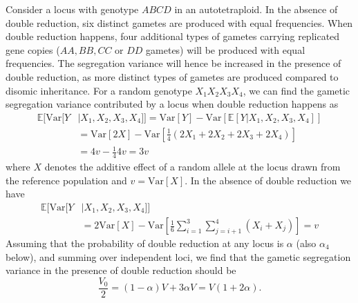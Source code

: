 \documentclass[unnumsec,webpdf,modern,large]{_oup-authoring-template}
\theoremstyle{thmstyleone}%
\theoremstyle{thmstyletwo}%
\theoremstyle{thmstylethree}%
\newcommand{\Ex}{\mathbb{E}}
\newcommand{\Var}{\mathrm{Var}}
\newcommand{\var}{\mathrm{Var}}
\begin{document}
Consider a locus with genotype $ABCD$ in an autotetraploid.
In the absence of double reduction, six distinct gametes are produced with
equal frequencies.
When double reduction happens, four additional types of gametes carrying
replicated gene copies ($AA, BB, CC$ or $DD$ gametes) will be produced with
equal frequencies.
The segregation variance will hence be increased in the presence of double
reduction, as more distinct types of gametes are produced compared to disomic
inheritance.
For a random genotype \(X_1X_2X_3X_4\), we can find the gametic segregation
variance contributed by a locus when double reduction happens as
\begin{align*}
    \Ex[\var[Y&|X_1,X_2,X_3,X_4]] = \var[Y] - \Var[\Ex[Y|X_1,X_2,X_3,X_4]] \\
        &= \var[2X] - \var\left[\frac1 4 (2X_1 + 2X_2 + 2X_3 + 2X_4)\right] \\
        &= 4v - \frac{1}{4}4v
        = 3v
\end{align*} where \(X\) denotes the additive effect of a random allele
at the locus drawn from the reference population and \(v = \Var[X]\).
In the absence of double reduction we have
\begin{align*}
    \Ex[\var[Y&|X_1,X_2,X_3,X_4]] \\
        &= 2\Var[X] - \var\left[\frac1 6 \sum_{i=1}^3 \sum_{j=i+1}^4(X_i+X_j)\right]
        = v
\end{align*}
Assuming that the probability of double reduction at any locus is \(\alpha\)
(also \(\alpha_4\) below), and summing over independent loci, we find that the
gametic segregation variance in the presence of double reduction should be
\begin{equation}
\frac{V_0}{2} = (1-\alpha)V + 3\alpha V = V(1+2\alpha).
\label{eq:dr}
\end{equation}
\end{document}
